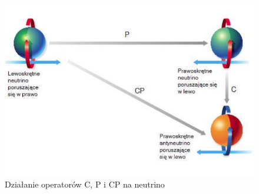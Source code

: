  \begin{figure}[ht]
 \centering
 \includegraphics[scale=0.7]{rozdzial1/CP.png}
 \caption{Działanie operatorów C, P i CP na neutrino}
 \label{fig:CP}
\end{figure}


